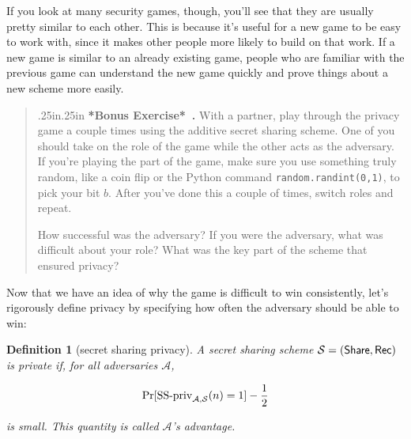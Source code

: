 \documentclass[12 pt]{article}
\newtheorem{definition}{Definition}
\def\A{\ensuremath{\mathcal{A}}}
\def\ss{\ensuremath{\mathcal{S}}}
\newcounter{exercise}[section]
\newenvironment{bonus}{\refstepcounter{exercise}\par\bigskip \begin{quotation}{}{\leftmargin .25in\rightmargin .25in}
    \noindent \textbf{*Bonus Exercise*~\thesection.\theexercise }  \rmfamily}{\end{quotation}\par\bigskip}
\newcounter{example}[section]
\begin{document}
If you look at many security games, though, you'll see that they are 
usually pretty similar to each other. This is because it's useful for a 
new game to be easy to work with, since it makes other people more likely 
to build on that work. If a new game is similar to an already existing game, 
people who are familiar with the previous game can understand the new game 
quickly and prove things about a new scheme more easily.

\begin{bonus}
    With a partner, play through the privacy game a couple times using the 
    additive secret sharing scheme. One of you should take on the role of the 
    game while the other acts as the adversary. If you're playing the part 
    of the game, make sure you use something truly random, like a coin 
    flip or the Python command \texttt{random.randint(0,1)}\footnotemark,
    to pick your bit $b$.
    After you've done this a couple of times, switch roles and repeat.

    How successful was the adversary? If you were the adversary, what was 
    difficult about your role? What was the key part of the scheme that 
    ensured privacy?
\end{bonus}

Now that we have an idea of why the game is difficult to win consistently, 
let's rigorously define privacy by specifying how often the adversary should 
be able to win: 

\begin{definition}[secret sharing privacy]
    A secret sharing scheme $\ss = (\share,\allowbreak \rec)$ is \emph{private} if,
    for all 
    adversaries \A,

    \[
        \Pr[\textnormal{SS-priv}_{\A,\ss}(n) = 1] - \frac{1}{2}
    \]

    is small\footnotemark. This quantity is called $\A$'s \emph{advantage}.
\end{definition}
\end{document}

